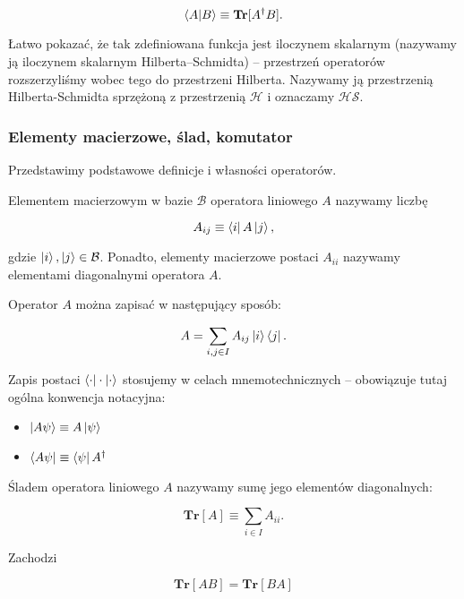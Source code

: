 $$
    \bra{A}\ket{B} \equiv \textbf{Tr}[A ^ {\dag} B].
$$

Łatwo pokazać, że tak zdefiniowana funkcja jest iloczynem skalarnym (nazywamy ją iloczynem skalarnym Hilberta--Schmidta) -- przestrzeń operatorów rozszerzyliśmy wobec tego do przestrzeni Hilberta. Nazywamy ją przestrzenią Hilberta-Schmidta sprzężoną z przestrzenią $\mathcal{H}$ i oznaczamy $\mathcal{HS}$.

\subsubsection{Elementy macierzowe, ślad, komutator}

Przedstawimy podstawowe definicje i własności operatorów.

\begin{definition}
    \label{definition:matrix-element}
    Elementem macierzowym w bazie $\mathcal{B}$ operatora liniowego $A$ nazywamy liczbę

    $$
        A_{ij} \equiv \bra{i} A \ket{j},
    $$

    gdzie $\ket{i}, \ket{j} \in \mathcal{B}$. Ponadto, elementy macierzowe postaci $A_{ii}$ nazywamy elementami diagonalnymi operatora $A$.
\end{definition}

Operator $A$ można zapisać w następujący sposób:

$$
    A = \sum\limits_{i, j \in I} A_{ij} \ket{i}\bra{j}.
$$

\begin{remark}
    Zapis postaci $\bra{\cdot}\cdot\ket{\cdot}$ stosujemy w celach mnemotechnicznych -- obowiązuje tutaj ogólna konwencja notacyjna:

    \begin{itemize}
        \item $\ket{A \psi} \equiv A \ket{\psi}$
        \item $\bra{A \psi} \equiv \bra{\psi} A ^ {\dag}$
    \end{itemize}
\end{remark}

\begin{definition}
    Śladem operatora liniowego $A$ nazywamy sumę jego elementów diagonalnych:

    $$
        \textbf{Tr}[A] \equiv \sum\limits_{i \in I} A_{ii}.
    $$
\end{definition}

\begin{theorem}
    Zachodzi

    $$
        \textbf{Tr}[AB] = \textbf{Tr}[BA]
    $$
\end{theorem}

